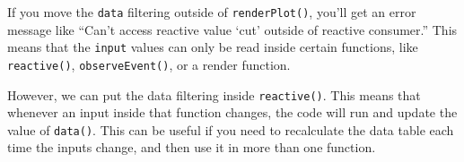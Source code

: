 \documentclass[
  oneside]{book}
\newenvironment{Shaded}{\begin{snugshade}}{\end{snugshade}}
\newcommand{\AttributeTok}[1]{\textcolor[rgb]{0.77,0.63,0.00}{#1}}
\newcommand{\ControlFlowTok}[1]{\textcolor[rgb]{0.13,0.29,0.53}{\textbf{#1}}}
\newcommand{\FloatTok}[1]{\textcolor[rgb]{0.00,0.00,0.81}{#1}}
\newcommand{\FunctionTok}[1]{\textcolor[rgb]{0.00,0.00,0.00}{#1}}
\newcommand{\NormalTok}[1]{#1}
\newcommand{\OtherTok}[1]{\textcolor[rgb]{0.56,0.35,0.01}{#1}}
\newcommand{\SpecialCharTok}[1]{\textcolor[rgb]{0.00,0.00,0.00}{#1}}
\newcommand{\StringTok}[1]{\textcolor[rgb]{0.31,0.60,0.02}{#1}}
\begin{document}
If you move the \texttt{data} filtering outside of \texttt{renderPlot}\texttt{()}, you'll get an error message like ``Can't access reactive value `cut' outside of reactive consumer.'' This means that the \texttt{input} values can only be read inside certain functions, like \texttt{reactive}\texttt{()}, \texttt{observeEvent}\texttt{()}, or a render function.

However, we can put the data filtering inside \texttt{reactive}\texttt{()}. This means that whenever an input inside that function changes, the code will run and update the value of \texttt{data}\texttt{()}. This can be useful if you need to recalculate the data table each time the inputs change, and then use it in more than one function.

\begin{Shaded}
\end{Shaded}
\end{document}
